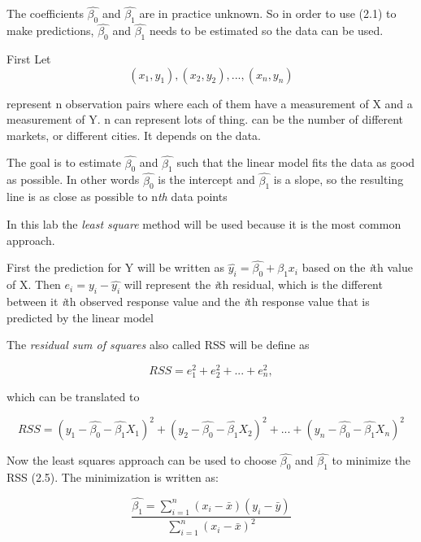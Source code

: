 The coefficients 
$\hat{\beta_0}$ and  $\hat{\beta_1}$ are in practice unknown. So in order to use (2.1) to make predictions, $\hat{\beta_0}$ and  $\hat{\beta_1}$ needs to be estimated so the data can be used. 

First Let 
\begin{equation}
(x_1, y_1), (x_2, y_2),..., (x_n, y_n)
\end{equation}

represent n observation pairs where each of them have a measurement of X and a measurement of Y. n can represent lots of thing. can be the number of different markets, or different cities. It depends on the data. 

The goal is to estimate $\hat{\beta_0}$ and  $\hat{\beta_1}$ such that the linear model fits the data as good as possible. In other words $\hat{\beta_0}$ is the intercept and  $\hat{\beta_1}$ is a slope, so the resulting line is as close as possible to n\emph{th} data points

In this lab the \emph{least square} method will be used because it is the most common approach. 

First the prediction for Y will be written as $\hat{y_i} = \hat{\beta_0} + \hat{\beta_1} x_i$ based on the \emph{i}th value of X.
Then $e_i = y_i - \hat{y_i}$ will represent the \emph{i}th residual, which is the different between it \emph{i}th observed response value and the \emph{i}th response value that is predicted by the linear model

The \emph{residual sum of squares} also called RSS will be define as

\begin{equation}
RSS = e^2_1 + e^2_2 + ... + e^2_n,
\end{equation}

which can be translated to

\begin{equation}
RSS = (y_1 - \hat{\beta_0} - \hat{\beta_1}X_1)^2 + (y_2 - \hat{\beta_0} - \hat{\beta_1}X_2)^2 + ... + (y_n - \hat{\beta_0} - \hat{\beta_1}X_n)^2
\end{equation}

Now the least squares approach can be used to choose $\hat{\beta_0}$ and $\hat{\beta_1}$ to minimize the RSS (2.5).
The minimization is written as:

\begin{equation}
\dfrac{\hat{\beta_1} = \sum\limits_{i=1}^n(x_i - \bar{x})(y_i - \bar{y})}{\sum\limits_{i=1}^n(x_i - \bar{x})^2}
\end{equation}

